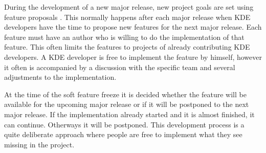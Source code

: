 During the development of a new major release, new project goals are set using
feature proposals \cite{KDEDevelopmentModel,KDEFAQ}. This normally happens
after each major release when KDE developers have the time to propose new
features for the next major release. Each feature must have an author who is
willing to do the implementation of that feature. This often limits the
features to projects of already contributing KDE developers. A KDE developer is
free to implement the feature by himself, however it often is accompanied by a
discussion with the specific team and several adjustments to the
implementation.

At the time of the soft feature freeze it is decided whether the feature will
be available for the upcoming major release or if it will be postponed to the
next major release. If the implementation already started and it is almost
finished, it can continue. Otherways it will be postponed. This development
process is a quite deliberate approach where people are free to implement what
they see missing in the project.


